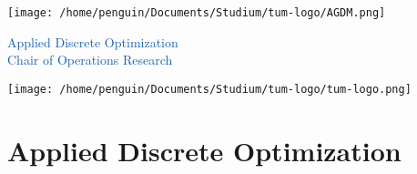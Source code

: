 \documentclass{article}
\begin{document}
\begin{center}
    \begin{minipage}{0.15\textwidth}
        \texttt{[image: /home/penguin/Documents/Studium/tum-logo/AGDM.png]} 
    \end{minipage}
    \hfill
    \begin{minipage}{0.4\textwidth}
        \centering
         \selectfont 
        \textcolor[HTML]{165DB1}{Applied Discrete Optimization} \\[1ex]
        \textcolor[HTML]{165DB1}{Chair of Operations Research} \\[1ex]
    \end{minipage}
    \hfill
    \begin{minipage}{0.12\textwidth}
        \texttt{[image: /home/penguin/Documents/Studium/tum-logo/tum-logo.png]} 
    \end{minipage}
\end{center}
\noindent
\normalsize
\section*{Applied Discrete Optimization}
\end{document}
